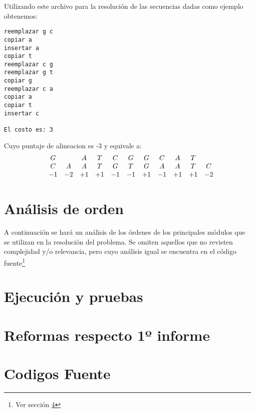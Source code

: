 \documentclass[12pt]{article}
\begin{document}
Utilizando este archivo para la resolución de las secuencias dadas como
ejemplo obtenemos:
\begin{lstlisting}
reemplazar g c
copiar a
insertar a
copiar t
reemplazar c g
reemplazar g t
copiar g
reemplazar c a
copiar a
copiar t
insertar c

El costo es: 3
\end{lstlisting}
Cuyo puntaje de alineacion es -3 y equivale a:
\[
\begin{array}{ccccccccccccc}
  &G &\space &A &T &C &G &G &C &A &T &\space  \\
  &C &A &A &T &G &T &G &A &A &T &C	\\
  &-1 &-2 &+1 &+1 &-1 &-1 &+1 &-1 &+1 &+1 &-2
\end{array}
\]

\newpage
\section{Análisis de orden}
A continuación se hará un análisis de los órdenes de los principales
módulos que se utilizan en la resolución del problema. Se omiten aquellos
que no revisten complejidad y/o relevancia, pero cuyo análisis igual se
encuentra en el código fuente\footnote{Ver sección \ref{sec:sourcecode}}

\newpage
\section{Ejecución y pruebas}


\newpage
\section{Reformas respecto 1º informe}

\newpage
\section{Codigos Fuente}\label{sec:sourcecode}

\end{document}
